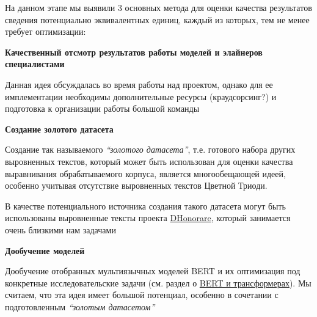 \documentclass[
  letterpaper,
]{book}
\begin{document}
На данном этапе мы выявили 3 основных метода для оценки качества
результатов сведения потенциально эквивалентных единиц, каждый из
которых, тем не менее требует оптимизации:

\begin{tcolorbox}[enhanced jigsaw, toprule=.15mm, colframe=quarto-callout-note-color-frame, colback=white, left=2mm, arc=.35mm, leftrule=.75mm, bottomrule=.15mm, rightrule=.15mm, opacityback=0, breakable]

\textbf{Качественный отсмотр результатов работы моделей и элайнеров
специалистами}\vspace{2mm}

Данная идея обсуждалась во время работы над проектом, однако для ее
имплементации необходимы дополнительные ресурсы (краудсорсинг?) и
подготовка к организации работы большой команды

\end{tcolorbox}

\begin{tcolorbox}[enhanced jigsaw, toprule=.15mm, colframe=quarto-callout-note-color-frame, colback=white, left=2mm, arc=.35mm, leftrule=.75mm, bottomrule=.15mm, rightrule=.15mm, opacityback=0, breakable]

\textbf{Создание золотого датасета}\vspace{2mm}

Создание так называемого \emph{``золотого датасета''}, т.е. готового
набора других выровненных текстов, который может быть использован для
оценки качества выравнивания обрабатываемого корпуса, является
многообещающей идеей, особенно учитывая отсутствие выровненных текстов
Цветной Триоди.

В качестве потенциального источника создания такого датасета могут быть
использованы выровненные тексты проекта
\href{https://dhonorare.ru/texts/trebnik/molitvy-v-pervyy-den-posle-rozhdeniya-mladentsa}{DHonorare},
который занимается очень близкими нам задачами

\end{tcolorbox}

\begin{tcolorbox}[enhanced jigsaw, toprule=.15mm, colframe=quarto-callout-note-color-frame, colback=white, left=2mm, arc=.35mm, leftrule=.75mm, bottomrule=.15mm, rightrule=.15mm, opacityback=0, breakable]

\textbf{Дообучение моделей}\vspace{2mm}

Дообучение отобранных мультиязычных моделей BERT и их оптимизация под
конкретные исследовательские задачи (см. раздел о
\protect\hyperlink{sec-about_bert}{BERT и трансформерах}). Мы считаем,
что эта идея имеет большой потенциал, особенно в сочетании с
подготовленным \emph{``золотым датасетом''}

\end{tcolorbox}
\end{document}
